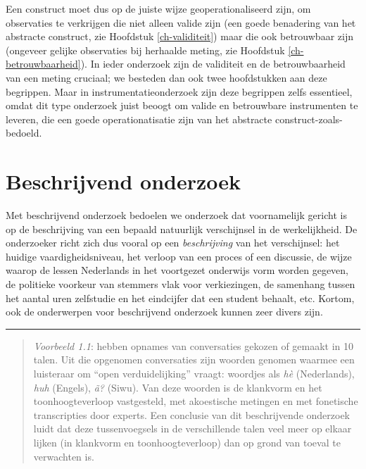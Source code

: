 \documentclass[
]{book}
\begin{document}
Een construct moet dus op de juiste wijze geoperationaliseerd zijn, om
observaties te verkrijgen die niet alleen valide zijn (een goede
benadering van het abstracte construct, zie Hoofdstuk \ref{ch-validiteit})
maar die ook betrouwbaar zijn (ongeveer
gelijke observaties bij herhaalde meting, zie
Hoofdstuk \ref{ch-betrouwbaarheid}).
In ieder onderzoek zijn de validiteit
en de betrouwbaarheid van een meting cruciaal; we besteden dan ook twee hoofdstukken aan deze begrippen.
Maar in instrumentatieonderzoek zijn
deze begrippen zelfs essentieel, omdat dit type onderzoek juist beoogt
om valide en betrouwbare instrumenten te leveren, die een goede
operationatisatie zijn van het abstracte construct-zoals-bedoeld.

\section{Beschrijvend onderzoek}\label{sec:beschrijvend-onderzoek}

Met beschrijvend onderzoek bedoelen we onderzoek dat voornamelijk
gericht is op de beschrijving van een bepaald natuurlijk verschijnsel in
de werkelijkheid. De onderzoeker richt zich dus vooral op een
\emph{beschrijving} van het verschijnsel: het huidige vaardigheidsniveau, het
verloop van een proces of een discussie, de wijze waarop de lessen
Nederlands in het voortgezet onderwijs vorm worden gegeven, de politieke
voorkeur van stemmers vlak voor verkiezingen, de samenhang tussen het
aantal uren zelfstudie en het eindcijfer dat een student behaalt, etc.
Kortom, ook de onderwerpen voor beschrijvend onderzoek kunnen zeer
divers zijn.

\begin{center}\rule{0.5\linewidth}{0.5pt}\end{center}

\begin{quote}
\emph{Voorbeeld 1.1}: \citep{DTE13} hebben opnames van conversaties gekozen of gemaakt in 10 talen. Uit die opgenomen conversaties zijn woorden genomen waarmee een luisteraar om
``open verduidelijking'' vraagt: woordjes als \emph{hè} (Nederlands), \emph{huh}
(Engels), \emph{ã?} (Siwu). Van deze woorden is de klankvorm en het
toonhoogteverloop vastgesteld, met akoestische metingen en met
fonetische transcripties door experts. Een conclusie van dit
beschrijvende onderzoek luidt dat deze tussenvoegsels in de
verschillende talen veel meer op elkaar lijken (in klankvorm en
toonhoogteverloop) dan op grond van toeval te verwachten is.
\end{quote}
\end{document}
